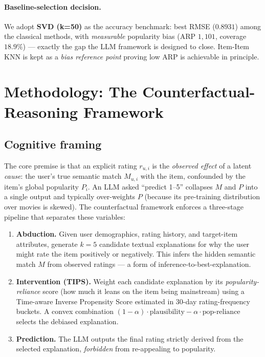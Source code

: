 \documentclass[11pt,a4paper]{article}
\begin{document}
\paragraph{Baseline-selection decision.}
We adopt \textbf{SVD (k=50)} as the accuracy benchmark: best RMSE
($0.8931$) among the classical methods, with \emph{measurable} popularity
bias (ARP $1{,}101$, coverage $18.9\%$) --- exactly the gap the LLM
framework is designed to close. Item-Item KNN is kept as a \emph{bias reference
point} proving low ARP is achievable in principle.

\section{Methodology: The Counterfactual-Reasoning Framework}
\label{sec:method}

\subsection{Cognitive framing}
The core premise is that an explicit rating $r_{u,i}$ is the
\emph{observed effect} of a latent \emph{cause}: the user's true semantic
match $M_{u,i}$ with the item, confounded by the item's global popularity
$P_i$. An LLM asked ``predict 1--5'' collapses $M$ and $P$ into a single
output and typically over-weights $P$ (because its pre-training distribution
over movies is skewed). The counterfactual framework enforces a
three-stage pipeline that separates these variables:
\begin{enumerate}[leftmargin=1.5em,itemsep=1pt]
\item[\textbf{A.}]\textbf{Abduction.}
  Given user demographics, rating history, and target-item attributes,
  generate $k{=}5$ candidate textual explanations for why the user might
  rate the item positively or negatively. This infers the hidden semantic
  match $M$ from observed ratings --- a form of inference-to-best-explanation.
\item[\textbf{I.}]\textbf{Intervention (TIPS).}
  Weight each candidate explanation by its \emph{popularity-reliance}
  score (how much it leans on the item being mainstream) using a
  Time-aware Inverse Propensity Score estimated in 30-day rating-frequency
  buckets. A convex combination $(1-\alpha)\cdot\text{plausibility} -
  \alpha\cdot\text{pop-reliance}$ selects the debiased explanation.
\item[\textbf{P.}]\textbf{Prediction.}
  The LLM outputs the final rating strictly derived from the selected
  explanation, \emph{forbidden} from re-appealing to popularity.
\end{enumerate}
\end{document}
